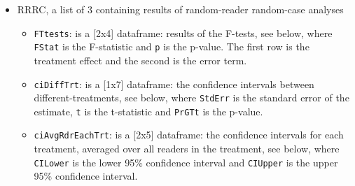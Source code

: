 \documentclass[
]{book}
\newenvironment{Shaded}{\begin{snugshade}}{\end{snugshade}}
\newcommand{\CommentTok}[1]{\textcolor[rgb]{0.56,0.35,0.01}{\textit{#1}}}
\newcommand{\FunctionTok}[1]{\textcolor[rgb]{0.00,0.00,0.00}{#1}}
\newcommand{\NormalTok}[1]{#1}
\newcommand{\SpecialCharTok}[1]{\textcolor[rgb]{0.00,0.00,0.00}{#1}}
\providecommand{\tightlist}{%
  \setlength{\itemsep}{0pt}\setlength{\parskip}{0pt}}
\begin{document}
\begin{Shaded}
\end{Shaded}

\begin{itemize}
\tightlist
\item
  RRRC, a list of 3 containing results of random-reader random-case analyses

  \begin{itemize}
  \tightlist
  \item
    \texttt{FTtests}: is a {[}2x4{]} dataframe: results of the F-tests, see below, where \texttt{FStat} is the F-statistic and \texttt{p} is the p-value. The first row is the treatment effect and the second is the error term.
  \item
    \texttt{ciDiffTrt}: is a {[}1x7{]} dataframe: the confidence intervals between different-treatments, see below, where \texttt{StdErr} is the standard error of the estimate, \texttt{t} is the t-statistic and \texttt{PrGTt} is the p-value.
  \item
    \texttt{ciAvgRdrEachTrt}: is a {[}2x5{]} dataframe: the confidence intervals for each treatment, averaged over all readers in the treatment, see below, where \texttt{CILower} is the lower 95\% confidence interval and \texttt{CIUpper} is the upper 95\% confidence interval.
  \end{itemize}
\end{itemize}
\end{document}

